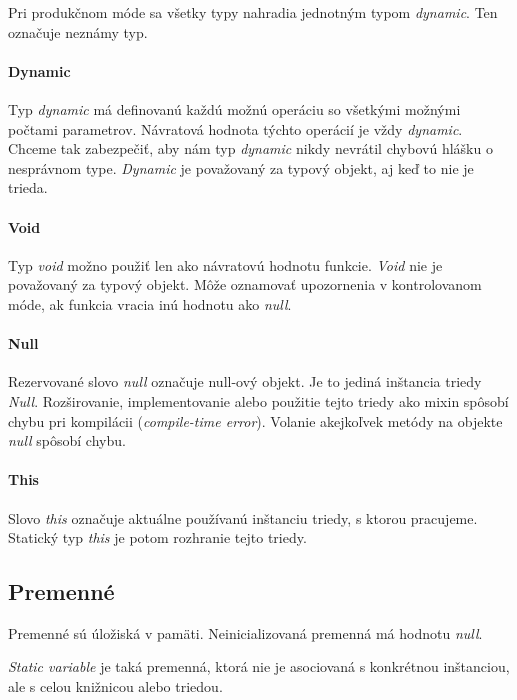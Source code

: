 Pri produkčnom móde sa všetky typy nahradia jednotným typom \emph{dynamic}. Ten označuje neznámy typ.

\paragraph{Dynamic}
Typ \emph{dynamic} má definovanú každú možnú operáciu so všetkými možnými počtami parametrov. Návratová hodnota týchto operácií je vždy \emph{dynamic}. Chceme tak zabezpečiť, aby nám typ \emph{dynamic} nikdy nevrátil chybovú hlášku o nesprávnom type. \emph{Dynamic} je považovaný za typový objekt, aj keď to nie je trieda.

\paragraph{Void}
Typ \emph{void} možno použiť len ako návratovú hodnotu funkcie. \emph{Void} nie je považovaný za typový objekt. Môže oznamovať upozornenia v kontrolovanom móde, ak funkcia vracia inú hodnotu ako \emph{null}.

\paragraph{Null}
Rezervované slovo \emph{null} označuje null-ový objekt. Je to jediná inštancia triedy \emph{Null}. Rozširovanie, implementovanie alebo použitie tejto triedy ako mixin spôsobí chybu pri kompilácii (\emph{compile-time error}).
Volanie akejkoľvek metódy na objekte \emph{null} spôsobí chybu.

\paragraph{This}%
Slovo \emph{this} označuje aktuálne používanú inštanciu triedy, s ktorou pracujeme. Statický typ \emph{this} je potom rozhranie tejto triedy.

\subsection{Premenné}
Premenné sú úložiská v pamäti. Neinicializovaná premenná má hodnotu \emph{null}.

\emph{Static variable} je taká premenná, ktorá nie je asociovaná s konkrétnou inštanciou, ale s celou knižnicou alebo triedou.

